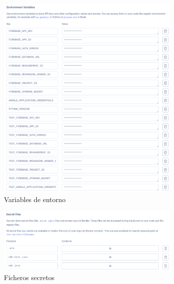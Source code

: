 \begin{figure}[H]
    \centering
    \includegraphics[width=0.8\textwidth]{imgs/env-variables.png}
    \caption{Variables de entorno}
    \label{fig:environment-variables}
\end{figure}

\begin{figure}[H]
    \centering
    \includegraphics[width=0.8\textwidth]{imgs/secret-files.png}
    \caption{Ficheros secretos}
    \label{fig:secret-files}
\end{figure}

\newpage
